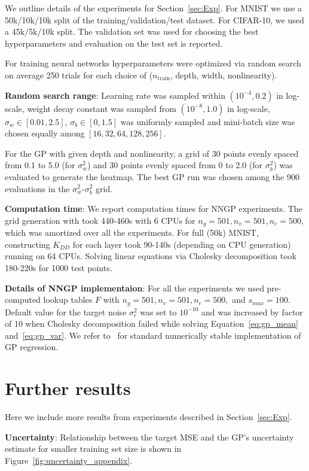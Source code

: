 \documentclass{article} %
\begin{document}
\begin{appendix}
We outline details of the experiments for Section~\ref{sec:Exp}.
For MNIST we use a 50k/10k/10k split of the training/validation/test dataset. For CIFAR-10, we used a 45k/5k/10k split.
The validation set was used for choosing the best hyperparameters and evaluation on the test set is reported.

For training neural networks hyperparameters were optimized via random search on average 250 trials for each choice of ($n_{\textrm{train}}$, depth, width, nonlinearity).

{\bf Random search range}: Learning rate was sampled within $(10^{-4}, 0.2)$ in log-scale, weight decay constant was sampled from $(10^{-8}, 1.0)$ in log-scale,  $\sigma_w \in [0.01, 2.5]$, $\sigma_b \in [0, 1.5]$ was uniformly sampled and mini-batch size was chosen equally among $[16, 32, 64, 128, 256]$.

For the GP with given depth and nonlinearity, a grid of 30 points evenly spaced from 0.1 to 5.0 (for $\sigma_w^2$) and 30 points evenly spaced from 0 to 2.0 (for $\sigma_b^2$) was evaluated to generate the heatmap. The best GP run was chosen among the 900 evaluations in the $\sigma_w^2$-$\sigma_b^2$ grid. 


{\bf Computation time}: We report computation times for NNGP experiments. The grid generation with took 440-460s with 6 CPUs for $n_g=501, n_v=501, n_c=500$, which was amortized over all the experiments.  For full (50k) MNIST, constructing $K_{DD}$ for each layer took 90-140s (depending on CPU generation) running on 64 CPUs. Solving linear equations via Cholesky decomposition took 180-220s for 1000 test points.


{\bf Details of NNGP implementaion}: For all the experiments we used pre-computed lookup tables $F$ with $n_g=501, n_v=501, n_c=500,$ and $s_{max}=100$. Default value for the target noise $\sigma_\epsilon ^2$ was set to $10^{-10}$ and was increased by factor of 10 when Cholesky decomposition failed while solving Equation~\ref{eq:gp_mean} and~\ref{eq:gp_var}. We refer to~\cite{rasmussen2006gaussian} for standard numerically stable implementation of GP regression.


\section{Further results}

Here we include more results from experiments described in Section~\ref{sec:Exp}.

{\bf Uncertainty}: Relationship between the target MSE and the GP's uncertainty estimate for smaller training set size is shown in Figure~\ref{fig:uncertainty_appendix}.


\end{appendix}
\end{document}
